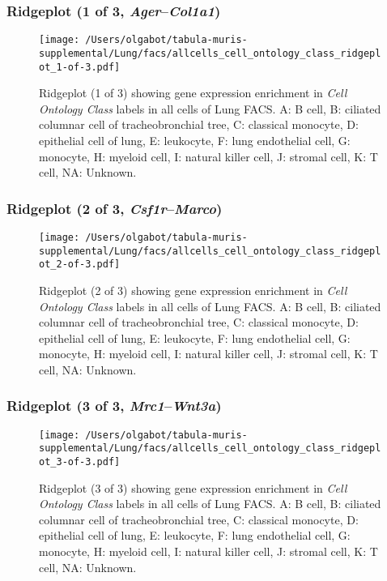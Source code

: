 \clearpage

\subsubsection{Ridgeplot (1 of 3, \emph{Ager}--\emph{Col1a1})}
\begin{figure}[h]
\centering
\texttt{[image: /Users/olgabot/tabula-muris-supplemental/Lung/facs/allcells\_cell\_ontology\_class\_ridgeplot\_1-of-3.pdf]}

\caption{ Ridgeplot (1 of 3)  showing gene expression enrichment in \emph{Cell Ontology Class} labels in all cells of Lung FACS. A: B cell, B: ciliated columnar cell of tracheobronchial tree, C: classical monocyte, D: epithelial cell of lung, E: leukocyte, F: lung endothelial cell, G: monocyte, H: myeloid cell, I: natural killer cell, J: stromal cell, K: T cell, NA: Unknown.}
\end{figure}


\clearpage

\subsubsection{Ridgeplot (2 of 3, \emph{Csf1r}--\emph{Marco})}
\begin{figure}[h]
\centering
\texttt{[image: /Users/olgabot/tabula-muris-supplemental/Lung/facs/allcells\_cell\_ontology\_class\_ridgeplot\_2-of-3.pdf]}

\caption{ Ridgeplot (2 of 3)  showing gene expression enrichment in \emph{Cell Ontology Class} labels in all cells of Lung FACS. A: B cell, B: ciliated columnar cell of tracheobronchial tree, C: classical monocyte, D: epithelial cell of lung, E: leukocyte, F: lung endothelial cell, G: monocyte, H: myeloid cell, I: natural killer cell, J: stromal cell, K: T cell, NA: Unknown.}
\end{figure}


\clearpage

\subsubsection{Ridgeplot (3 of 3, \emph{Mrc1}--\emph{Wnt3a})}
\begin{figure}[h]
\centering
\texttt{[image: /Users/olgabot/tabula-muris-supplemental/Lung/facs/allcells\_cell\_ontology\_class\_ridgeplot\_3-of-3.pdf]}

\caption{ Ridgeplot (3 of 3)  showing gene expression enrichment in \emph{Cell Ontology Class} labels in all cells of Lung FACS. A: B cell, B: ciliated columnar cell of tracheobronchial tree, C: classical monocyte, D: epithelial cell of lung, E: leukocyte, F: lung endothelial cell, G: monocyte, H: myeloid cell, I: natural killer cell, J: stromal cell, K: T cell, NA: Unknown.}
\end{figure}


